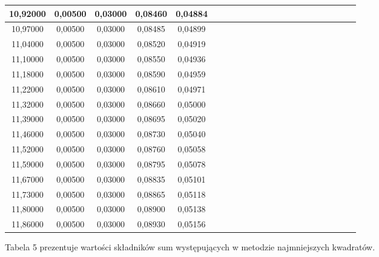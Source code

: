 \documentclass[10pt,a4paper]{article}
\begin{document}
\begin{center}
\begin{table}[h!]
\begin{tabular}{|c|c|c|c|c|c|c|c|c|c|c|c|c|c|c|c|c|c|c|c|c|c|}
10,92000 & 0,00500 & 0,03000 & 0,08460 & 0,04884 \\ \hline
10,97000 & 0,00500 & 0,03000 & 0,08485 & 0,04899 \\ \hline
11,04000 & 0,00500 & 0,03000 & 0,08520 & 0,04919 \\ \hline
11,10000 & 0,00500 & 0,03000 & 0,08550 & 0,04936 \\ \hline
11,18000 & 0,00500 & 0,03000 & 0,08590 & 0,04959 \\ \hline
11,22000 & 0,00500 & 0,03000 & 0,08610 & 0,04971 \\ \hline
11,32000 & 0,00500 & 0,03000 & 0,08660 & 0,05000 \\ \hline
11,39000 & 0,00500 & 0,03000 & 0,08695 & 0,05020 \\ \hline
11,46000 & 0,00500 & 0,03000 & 0,08730 & 0,05040 \\ \hline
11,52000 & 0,00500 & 0,03000 & 0,08760 & 0,05058 \\ \hline
11,59000 & 0,00500 & 0,03000 & 0,08795 & 0,05078 \\ \hline
11,67000 & 0,00500 & 0,03000 & 0,08835 & 0,05101 \\ \hline
11,73000 & 0,00500 & 0,03000 & 0,08865 & 0,05118 \\ \hline
11,80000 & 0,00500 & 0,03000 & 0,08900 & 0,05138 \\ \hline
11,86000 & 0,00500 & 0,03000 & 0,08930 & 0,05156 \\ \hline
 \end{tabular}
 \end{table}
 \end{center}
 
Tabela 5 prezentuje wartości składników sum występujących w metodzie najmniejszych kwadratów. 
\end{document}
